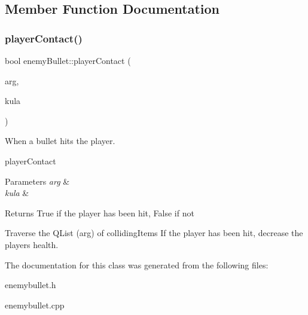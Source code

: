 \subsection{Member Function Documentation}
\mbox{\label{classenemyBullet_a2e2e8de44bed2bff6b949b39a61efba9}} 
\subsubsection{\texorpdfstring{player\+Contact()}{playerContact()}}
{\footnotesize\ttfamily bool enemy\+Bullet\+::player\+Contact (\begin{DoxyParamCaption}\item[{Q\+List$<$ Q\+Graphics\+Item $\ast$$>$}]{arg,  }\item[{\hyperlink{classenemyBullet}{enemy\+Bullet} $\ast$}]{kula }\end{DoxyParamCaption})}



When a bullet hits the player. 

player\+Contact 
\begin{DoxyParams}{Parameters}
{\em arg} & \\
\hline
{\em kula} & \\
\hline
\end{DoxyParams}
\begin{DoxyReturn}{Returns}
True if the player has been hit, False if not
\end{DoxyReturn}
Traverse the Q\+List (arg) of colliding\+Items If the player has been hit, decrease the players health. 

The documentation for this class was generated from the following files\+:\begin{DoxyCompactItemize}
\item 
enemybullet.\+h\item 
enemybullet.\+cpp\end{DoxyCompactItemize}
